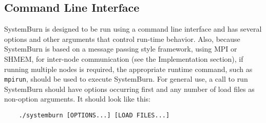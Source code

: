 \subsection{Command Line Interface}

SystemBurn is designed to be run using a command line interface
and has several options and other arguments that control run-time
behavior. Also, because SystemBurn is based on a message passing
style framework, using MPI or SHMEM, for inter-node communication
(see the Implementation section), if running multiple nodes is 
required, the appropriate runtime command, such as \verb!mpirun!,
should be used to execute SystemBurn. For general use, a call to run
SystemBurn should have options occurring first and any number of load
files as non-option arguments. It should look like this:

\begin{verbatim}
	./systemburn [OPTIONS...] [LOAD FILES...]

\end{verbatim}

